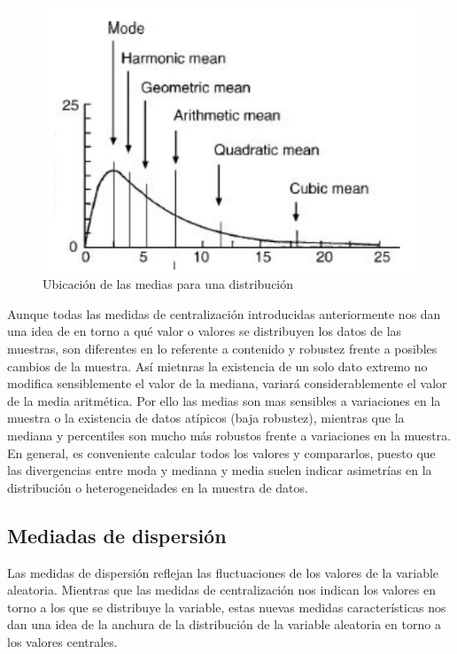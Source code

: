 \documentclass[12pt,a4paper]{book}
\begin{document}
\begin{itemize}
\begin{figure}[h!] \centering
\includegraphics[scale=0.8]{medias.png}
\caption{Ubicación de las medias para una distribución}
\end{figure}


\end{itemize}


Aunque todas las medidas de centralización introducidas anteriormente nos dan una idea de en torno a qué valor o valores se distribuyen los datos de las muestras, son diferentes en lo referente a contenido y robustez frente a posibles cambios de la muestra. Así mietnras la existencia de un solo dato extremo no modifica sensiblemente el valor de la mediana, variará considerablemente el valor de la media aritmética. Por ello las medias son mas sensibles a variaciones en la muestra o la existencia de datos atípicos (baja robustez), mientras que la mediana y percentiles son mucho más robustos frente a variaciones en la muestra. En general, es conveniente calcular todos los valores y compararlos, puesto que las divergencias entre moda y mediana y media suelen indicar asimetrías en la distribución o heterogeneidades en la muestra de datos.


\subsection{Mediadas de dispersión}

Las medidas de dispersión reflejan las fluctuaciones de los valores de la variable aleatoria. Mientras que las medidas de centralización nos indican los valores en torno a los que se distribuye la variable, estas nuevas medidas características nos dan una idea de la anchura de la distribución de la variable aleatoria en torno a los valores centrales. \\
\end{document}
